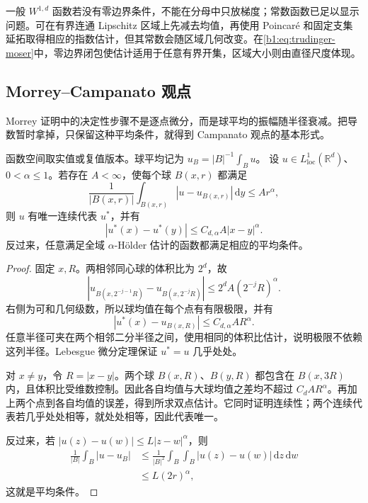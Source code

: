 \ProseParagraphBreak

一般 \(W^{1,d}\) 函数若没有零边界条件，不能在分母中只放梯度；常数函数已足以显示问题。可在有界连通 Lipschitz 区域上先减去均值，再使用 Poincaré 和固定支集延拓取得相应的指数估计，但其常数会随区域几何改变。在\eqref{b1:eq:trudinger-moser}中，零边界闭包使估计适用于任意有界开集，区域大小则由直径尺度体现。

\subsection{Morrey–Campanato 观点}
\label{b1:subsec:240503}

Morrey 证明中的决定性步骤不是逐点微分，而是球平均的振幅随半径衰减。把导数暂时拿掉，只保留这种平均条件，就得到 Campanato 观点的基本形式。

\begin{proposition}\label{b1:prop:campanato-holder}
函数空间取实值或复值版本。球平均记为 \(u_B=|B|^{-1}\int_Bu\)。
设 \(u\in L^1_{\mathrm{loc}}(\mathbb R^d)\)、\(0<\alpha\le1\)。若存在 \(A<\infty\)，使每个球 \(B(x,r)\) 都满足
\begin{equation}\label{b1:eq:campanato-mean-condition}
 \frac1{|B(x,r)|}\int_{B(x,r)}
       |u-u_{B(x,r)}|\,\mathrm dy\le Ar^\alpha,
\end{equation}
则 \(u\) 有唯一连续代表 \(u^*\)，并有
\[
 |u^*(x)-u^*(y)|\le C_{d,\alpha}A|x-y|^\alpha.
\]
反过来，任意满足全域 \(\alpha\)-Hölder 估计的函数都满足相应的平均条件。
\end{proposition}
\begin{proof}
固定 \(x,R\)。两相邻同心球的体积比为 \(2^d\)，故
\[
 |u_{B(x,2^{-j-1}R)}-u_{B(x,2^{-j}R)}|
 \le2^dA(2^{-j}R)^\alpha.
\]
右侧为可和几何级数，所以球均值在每个点有有限极限，并有
\[
 |u^*(x)-u_{B(x,R)}|
 \le C_{d,\alpha}AR^\alpha.
\]
任意半径可夹在两个相邻二分半径之间，使用相同的体积比估计，说明极限不依赖这列半径。Lebesgue 微分定理保证 \(u^*=u\) 几乎处处。

对 \(x\ne y\)，令 \(R=|x-y|\)。两个球 \(B(x,R)\)、\(B(y,R)\) 都包含在 \(B(x,3R)\) 内，且体积比受维数控制。因此各自均值与大球均值之差均不超过 \(C_dAR^\alpha\)。再加上两个点到各自均值的误差，得到所求双点估计。它同时证明连续性；两个连续代表若几乎处处相等，就处处相等，因此代表唯一。

反过来，若 \(|u(z)-u(w)|\le L|z-w|^\alpha\)，则
\[
 \begin{aligned}
 \frac1{|B|}\int_B|u-u_B|
 &\le\frac1{|B|^2}\int_B\int_B|u(z)-u(w)|\,\mathrm dz\,\mathrm dw\\
 &\le L(2r)^\alpha,
 \end{aligned}
\]
这就是平均条件。
\end{proof}

